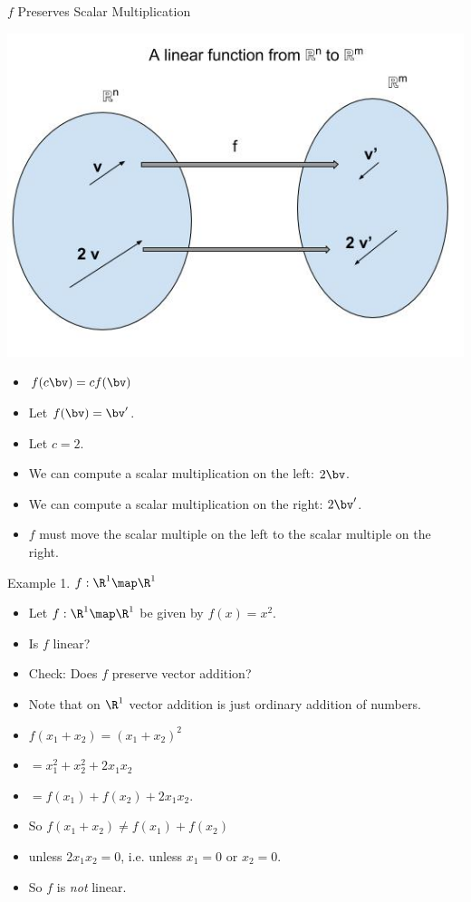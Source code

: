 \documentclass{beamer}
\begin{document}
\begin{frame}{$f$ Preserves Scalar Multiplication}

\begin{center}
\includegraphics[scale=0.25]{preserving-scalar-mult}
\end{center}

\begin{itemize}
\item $f(c \bv) = c f(\bv)$
\item Let $f(\bv) = \bv^{\prime}$.
\item Let $c = 2$.
\item We can compute a scalar multiplication on the left: $2 \bv$.
\item We can compute a scalar multiplication on the right: $2 \bv^{\prime}$.
\item $f$ must move the scalar multiple on the left to the scalar multiple on the right.
\end{itemize}

\end{frame}

\begin{frame}{Example 1. $f:\R^1\map\R^1$}

\begin{itemize}
\item Let $f:\R^1\map\R^1$ be given by $f(x) = x^2$.
\item Is $f$ linear?
\item Check: Does $f$ preserve vector addition?
\item Note that on $\R^1$ vector addition is just ordinary addition of numbers.
\item $f(x_1 + x_2) = (x_1 + x_2)^2$
\item $= x_1^2 + x_2^2 + 2 x_1 x_2$
\item $= f(x_1) + f(x_2) + 2 x_1 x_2$.
\item So $f(x_1 + x_2) \not= f(x_1) + f(x_2)$
\item unless $2 x_1 x_2 = 0$, i.e. unless $x_1 = 0$ or $x_2 = 0$.
\item So $f$ is \emph{not} linear.
\end{itemize}

\end{frame}
\end{document}
